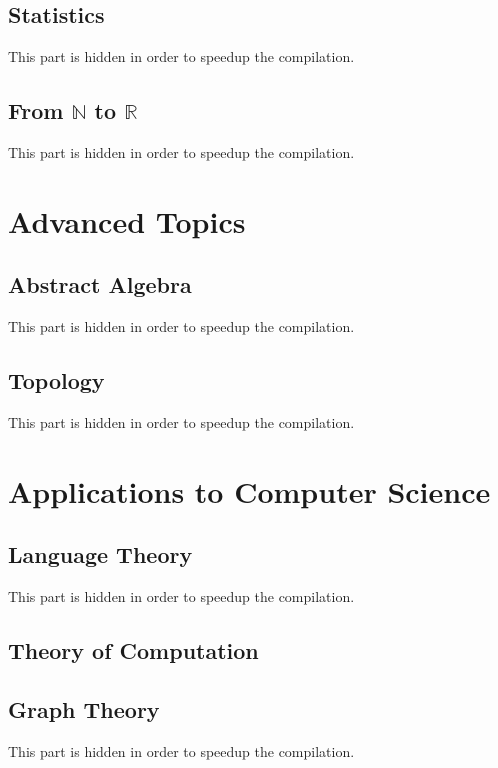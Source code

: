 \documentclass{report}
\theoremstyle{break}
\begin{document}
		\chapter{Statistics}
		    This part is hidden in order to speedup the compilation.
			
		\chapter{From $\mathbb{N}$ to $\mathbb{R}$}
		    This part is hidden in order to speedup the compilation.
	
	\part{Advanced Topics}
	    
	    \chapter{Abstract Algebra}
	        This part is hidden in order to speedup the compilation.
	    
	    \chapter{Topology}
	        This part is hidden in order to speedup the compilation.

	\part{Applications to Computer Science}
	
		\chapter{Language Theory}
		    This part is hidden in order to speedup the compilation.
		
		\chapter{Theory of Computation}
			
		
		\chapter{Graph Theory}
		    This part is hidden in order to speedup the compilation.
		
\end{document}
